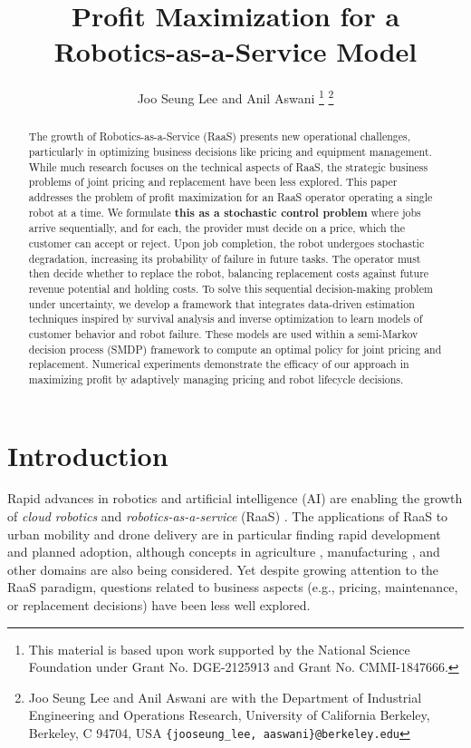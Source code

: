 \documentclass[letterpaper, 10 pt, conference]{IEEEconf}
\title{\LARGE \bf
Profit Maximization for a Robotics-as-a-Service Model
}
\author{Joo Seung Lee and Anil Aswani%
\thanks{This material is based upon work supported by the National Science Foundation under Grant No. DGE-2125913 and Grant No. CMMI-1847666.}%
\thanks{Joo Seung Lee and Anil Aswani are with the Department of Industrial Engineering and Operations Research, University of California Berkeley, Berkeley, C 94704, USA
        {\tt\small \{jooseung\_lee, aaswani\}@berkeley.edu}}%
}
\begin{document}
\maketitle
\thispagestyle{empty}
\pagestyle{empty}

\begin{abstract}
The growth of Robotics-as-a-Service (RaaS) presents new operational challenges, particularly in optimizing business decisions like pricing and equipment management. While much research focuses on the technical aspects of RaaS, the strategic business problems of joint pricing and replacement have been less explored. This paper addresses the problem of profit maximization for an RaaS operator operating a single robot at a time. We formulate \textbf{this as a stochastic control problem} where jobs arrive sequentially, and for each, the provider must decide on a price, which the customer can accept or reject. Upon job completion, the robot undergoes stochastic degradation, increasing its probability of failure in future tasks. The operator must then decide whether to replace the robot, balancing replacement costs against future revenue potential and holding costs. To solve this sequential decision-making problem under uncertainty, we develop a framework that integrates data-driven estimation techniques inspired by survival analysis and inverse optimization to learn models of customer behavior and robot failure. These models are used within a semi-Markov decision process (SMDP) framework to compute an optimal policy for joint pricing and replacement. Numerical experiments demonstrate the efficacy of our approach in maximizing profit by adaptively managing pricing and robot lifecycle decisions.

\end{abstract}
\section{Introduction}

Rapid advances in robotics and artificial intelligence (AI) are enabling the growth of \emph{cloud robotics} and \emph{robotics-as-a-service} (RaaS) \cite{chen2010robot,hu2012cloud,kehoe2015survey,buerkle2023towards}. The applications of RaaS to urban mobility \cite{straubinger2020overview,cohen2021urban} and drone delivery \cite{dorling2016vehicle,scott2017drone} are in particular finding rapid development and planned adoption, although concepts in agriculture \cite{dharmasena2019autonomous,milella2024robot}, manufacturing \cite{yan2017cloud}, and other domains \cite{hu2012cloud,toscano2022integrating} are also being considered. Yet despite growing attention to the RaaS paradigm, questions related to business aspects (e.g.,  pricing, maintenance, or replacement decisions) have been less well explored.
\end{document}
